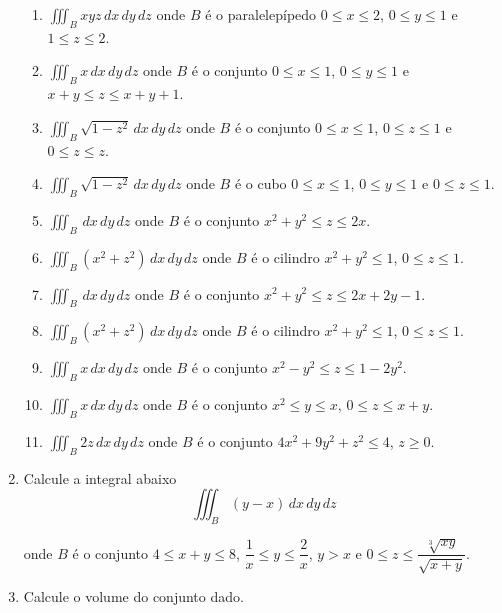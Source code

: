 \documentclass[11pt,a4paper]{article}
\begin{document}
\begin{enumerate}
\begin{enumerate}
\item $\displaystyle\iiint_B xyz \,dx\,dy\,dz$ onde $B$ é o paralelepípedo $0 \leq x \leq 2$, $0 \leq y \leq 1$ e $1 \leq z \leq 2$.
\item $\displaystyle\iiint_B x \,dx\,dy\,dz$ onde $B$ é o conjunto $0 \leq x \leq 1$, $0 \leq y \leq 1$ e $x + y \leq z \leq x + y + 1$.
\item $\displaystyle\iiint_B \sqrt{1 - z^2} \,dx\,dy\,dz$ onde $B$ é o conjunto $0 \leq x \leq 1$, $0 \leq z \leq 1$ e $0 \leq z \leq z$.
\item $\displaystyle\iiint_B \sqrt{1 - z^2} \,dx\,dy\,dz$ onde $B$ é o cubo $0 \leq x \leq 1$, $0 \leq y \leq 1$ e $0 \leq z \leq 1$.
\item $\displaystyle\iiint_B \,dx\,dy\,dz$ onde $B$ é o conjunto $x^2 + y^2 \leq z \leq 2x$.
\item $\displaystyle\iiint_B (x^2 + z^2) \,dx\,dy\,dz$ onde $B$ é o cilindro $x^2 + y^2 \leq 1$, $0 \leq z \leq 1$.
\item $\displaystyle\iiint_B \,dx\,dy\,dz$ onde $B$ é o conjunto $x^2 + y^2 \leq z \leq 2x + 2y - 1$.
\item $\displaystyle\iiint_B (x^2 + z^2)\,dx\,dy\,dz$ onde $B$ é o cilindro $x^2 + y^2 \leq 1$, $0 \leq z \leq 1$.
\item $\displaystyle\iiint_B x \,dx\,dy\,dz$ onde $B$ é o conjunto $x^2 - y^2 \leq z \leq 1 - 2y^2$.
\item $\displaystyle\iiint_B x \,dx\,dy\,dz$ onde $B$ é o conjunto $x^2 \leq y   \leq x$, $0 \leq z \leq x + y$.
\item $\displaystyle\iiint_B 2z \,dx\,dy\,dz$ onde $B$ é o conjunto $4x^2 + 9y^2 + z^2 \leq 4$, $z \geq 0$.

\end{enumerate}

\item Calcule a integral abaixo
$$\displaystyle\iiint_B (y - x) \,dx\,dy\,dz$$

onde $B$ é o conjunto $4 \leq x + y \leq 8$, $\dfrac{1}{x} \leq y \leq \dfrac{2}{x}$, $y > x$ e $0 \leq z \leq \dfrac{\sqrt[3]{xy}}{\sqrt{x + y}}$.

\item Calcule o volume do conjunto dado. 

\begin{enumerate}


\end{enumerate}
\end{enumerate}
\end{document}
